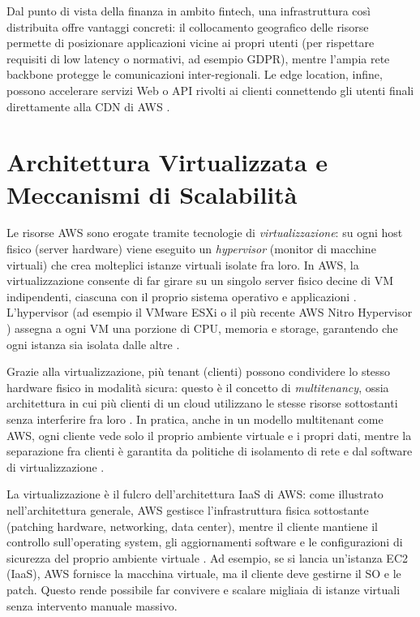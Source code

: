 Dal punto di vista della finanza in ambito fintech, una infrastruttura così distribuita offre vantaggi concreti: il collocamento geografico delle risorse permette di posizionare applicazioni vicine ai propri utenti (per rispettare requisiti di low latency o normativi, ad esempio GDPR), mentre l’ampia rete backbone protegge le comunicazioni inter-regionali. Le edge location, infine, possono accelerare servizi Web o API rivolti ai clienti connettendo gli utenti finali direttamente alla CDN di AWS \cite{aws-cloudfront}.

\section{Architettura Virtualizzata e Meccanismi di Scalabilità}
Le risorse AWS sono erogate tramite tecnologie di \textit{virtualizzazione}: su ogni host fisico (server hardware) viene eseguito un \textit{hypervisor} (monitor di macchine virtuali) che crea molteplici istanze virtuali isolate fra loro. In AWS, la virtualizzazione consente di far girare su un singolo server fisico decine di VM indipendenti, ciascuna con il proprio sistema operativo e applicazioni \cite{ibm_iaas}. L’hypervisor (ad esempio il VMware ESXi o il più recente AWS Nitro Hypervisor \cite{aws-nitro-hypervisor}) assegna a ogni VM una porzione di CPU, memoria e storage, garantendo che ogni istanza sia isolata dalle altre \cite{ibm_iaas}.

Grazie alla virtualizzazione, più tenant (clienti) possono condividere lo stesso hardware fisico in modalità sicura: questo è il concetto di \textit{multitenancy}, ossia architettura in cui più clienti di un cloud utilizzano le stesse risorse sottostanti senza interferire fra loro \cite{nist800-145}. In pratica, anche in un modello multitenant come AWS, ogni cliente vede solo il proprio ambiente virtuale e i propri dati, mentre la separazione fra clienti è garantita da politiche di isolamento di rete e dal software di virtualizzazione \cite{nist800-145}.

La virtualizzazione è il fulcro dell’architettura IaaS di AWS: come illustrato nell’architettura generale, AWS gestisce l’infrastruttura fisica sottostante (patching hardware, networking, data center), mentre il cliente mantiene il controllo sull’operating system, gli aggiornamenti software e le configurazioni di sicurezza del proprio ambiente virtuale \cite{aws-well-architected}. Ad esempio, se si lancia un’istanza EC2 (IaaS), AWS fornisce la macchina virtuale, ma il cliente deve gestirne il SO e le patch. Questo rende possibile far convivere e scalare migliaia di istanze virtuali senza intervento manuale massivo.


